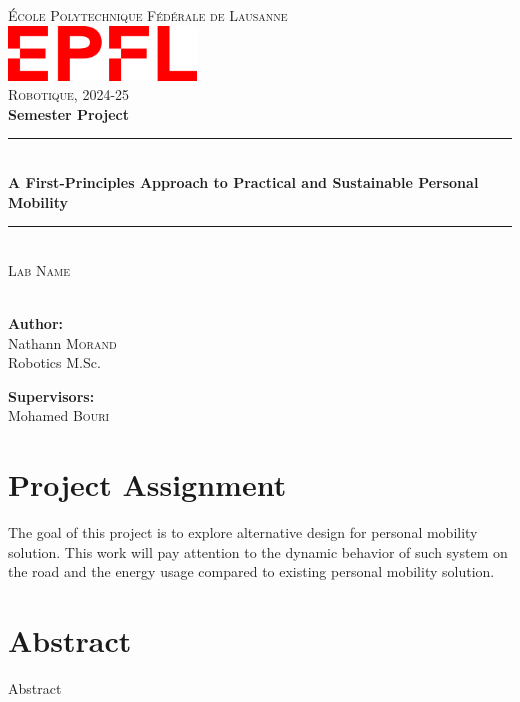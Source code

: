 \documentclass[a4paper, 11 pt]{article}
\begin{document}
\thispagestyle{empty}
\begin{center}
    \newcommand{\HRule}{\rule{\linewidth}{0.5mm}}
    
    \textsc{\LARGE École Polytechnique Fédérale de Lausanne}\\[0.5cm]
    \includegraphics[width=5cm]{Figures/epfl_red.png}\\[0.5cm]
    \LARGE{\textsc{Robotique, 2024-25}}\\[0.5cm]
    \huge{\textbf{Semester Project}}
    
    \HRule \\[0.4cm]
    {\huge \bfseries A First-Principles Approach to Practical and Sustainable Personal Mobility}\\[0.1cm]
    \HRule \\[0.5cm]
    \LARGE{\textsc{Lab Name} \\
    }\\[0.5cm]
    
    \vspace{5mm}
    \vspace{15mm}
    
    \begin{minipage}{2in} \Large
    \textbf{Author:}\\
    Nathann \textsc{Morand}\\
    Robotics M.Sc.
    \end{minipage}
    \hfill
    \begin{minipage}{2.1in} \Large
    \textbf{Supervisors:}\\
    Mohamed \textsc{Bouri} \\
    \end{minipage}
\end{center}

\newpage
\renewcommand{\contentsname}{Table of Contents} 
{
  \hypersetup{linkcolor=black}
  \tableofcontents
}
\newpage

{ %

\section*{Project Assignment}
The goal of this project is to explore alternative design for personal mobility solution. This work will pay attention to the dynamic behavior of such system on the road and the energy usage compared to existing personal mobility solution.
\section*{Abstract}
Abstract
    
\newpage
}
\end{document}
